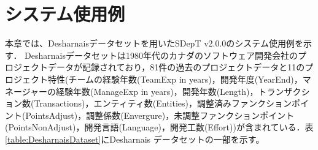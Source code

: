 \section{システム使用例}\label{sec:4}%
本章では、Desharnaisデータセット\cite{Desharnais89}を用いたSDepT v2.0.0のシステム使用例を示す．
Desharnaisデータセットは1980年代のカナダのソフトウェア開発会社のプロジェクトデータが記録されており，81件の過去のプロジェクトデータと11のプロジェクト特性(チームの経験年数(TeamExp in years)，開発年度(YearEnd)，マネージャーの経験年数(ManageExp in years)，開発年数(Length)，トランザクション数(Transactions)，エンティティ数(Entities)，調整済みファンクションポイント(PointsAdjust)，調整係数(Envergure)，未調整ファンクションポイント(PointsNonAdjust)，開発言語(Language)，開発工数(Effort))が含まれている．表\ref{table:DesharnaisDataset}にDesharnais データセットの一部を示す。



